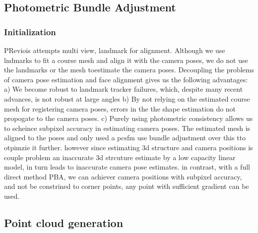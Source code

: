 \documentclass[10pt,twocolumn,letterpaper]{article}
\begin{document}



\subsection{Photometric Bundle Adjustment}

\subsubsection{Initialization}
PReviois attempts multi view, landmark for alignment. 
Although we use lndmarks to fit a course mesh and align it with the camera poses, we do not use the landmarks or the mesh toestimate the camera poses. Decoupling the problems of camera pose estimation and face alignment gives us the following advantages: a) We become robust to landmark tracker failures, which, despite many recent advances, is not robust at large angles  b) By not relying on the estimated course mesh for registering camera poses, errors in the the shape estimation do not propogate to the camera poses. c) Purely using photometric consistency allows us to scheince subpixel accuracy in estimating camera poses. The estimated mesh is aligned to the poses and only used a
pcsfm use bundle adjustment over this tto otpimzie it further. however since estimating 3d structure and camera positions is couple problem
an inaccurate 3d strcuture estimate by a low capacity linear model, in turn leads to inaccurate camera pose estimates.
in contrast, with a full direct method PBA, we can achiever camera positions with subpixel accuracy, and not be constrined to corner points,
any point with sufficient gradient can be used.

\subsection{Point cloud generation}
\end{document}
